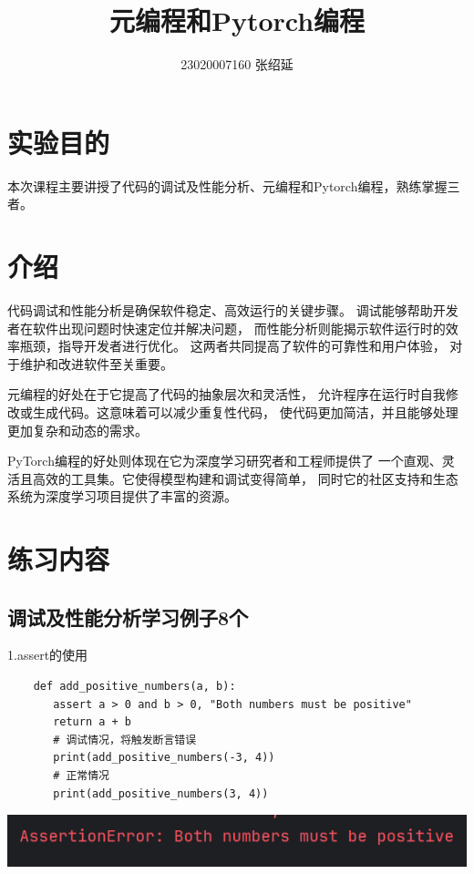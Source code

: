 \documentclass{article}
\title{元编程和Pytorch编程}
\author{23020007160  张绍延}
\begin{document}
\maketitle

\section{实验目的}
本次课程主要讲授了代码的调试及性能分析、元编程和Pytorch编程，熟练掌握三者。

\section{介绍}
代码调试和性能分析是确保软件稳定、高效运行的关键步骤。
调试能够帮助开发者在软件出现问题时快速定位并解决问题，
而性能分析则能揭示软件运行时的效率瓶颈，指导开发者进行优化。
这两者共同提高了软件的可靠性和用户体验，
对于维护和改进软件至关重要。

元编程的好处在于它提高了代码的抽象层次和灵活性，
允许程序在运行时自我修改或生成代码。这意味着可以减少重复性代码，
使代码更加简洁，并且能够处理更加复杂和动态的需求。

PyTorch编程的好处则体现在它为深度学习研究者和工程师提供了
一个直观、灵活且高效的工具集。它使得模型构建和调试变得简单，
同时它的社区支持和生态系统为深度学习项目提供了丰富的资源。

\section{练习内容}
\subsection{调试及性能分析学习例子8个}

1.assert的使用
\begin{verbatim}
    def add_positive_numbers(a, b):
       assert a > 0 and b > 0, "Both numbers must be positive"
       return a + b
       # 调试情况，将触发断言错误
       print(add_positive_numbers(-3, 4))
       # 正常情况
       print(add_positive_numbers(3, 4))
\end{verbatim}

 
\noindent
\begin{minipage}{\linewidth}
  \centering
  \includegraphics[width=0.5\linewidth]{学习1.png}
  \label{fig:example}
\end{minipage}
\end{document}

